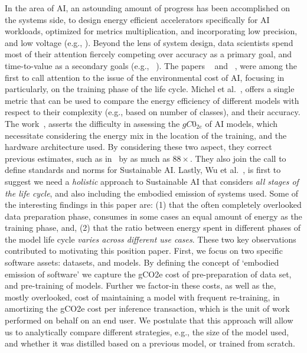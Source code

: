 {{        In the area of AI, an astounding amount of progress has been accomplished on the systems side, to design energy efficient accelerators specifically for AI workloads, optimized for metrics multiplication, and incorporating low precision, and low voltage (e.g., \cite{Agrawal2016,Brooks2000}). Beyond the lens of system design, data scientists spend most of their attention fiercely competing over accuracy as a primary goal, and time-to-value as a secondary goals (e.g., ~\cite{Liu2019}). The papers ~\cite{Strubell2019} and ~\cite{Schwartz2019}, were among the first to call attention to the issue of the environmental cost of AI, focusing in particularly, on the training phase of the life cycle. {Michel et al.}~\cite{Lenherr2021}, offers a single metric that can be used to compare the energy efficiency of different models with respect to their complexity (e.g., based on number of classes), and their accuracy. The work~\cite{Patterson2021}, asserts the difficulty in assessing the $gC0_{2e}$ of AI models, which necessitate considering the energy mix in the location of the training, and the hardware architecture used. By considering these two aspect, they correct previous estimates, such as in~\cite{Strubell2019} by as much as $88 \times$. They also join the call to define standards and norms for Sustainable AI. Lastly, {Wu et al.}~\cite{Wu2022}, is first to suggest we need a \textit{holistic} approach to Sustainable AI that considers \textit{all stages of the life cycle}, and also including the embodied emission of systems used. Some of the interesting findings in this paper are: (1) that the often completely overlooked data preparation phase, consumes in some cases an equal amount of energy as the training phase, and, (2) that the ratio between energy spent in different phases of the model life cycle  \textit{varies across different use cases}. These two key observations contributed to motivating this position paper. First, we focus on two specific software assets: datasets, and models. By defining the concept of `embodied emission of software' we capture the gCO2e cost of pre-preparation of data set, and pre-training of models. Further we factor-in these costs, as well as the, mostly overlooked, cost of maintaining a model with frequent re-training, in amortizing the gCO2e cost per inference transaction, which is the unit of work performed on behalf on an end user. We postulate that this  approach will allow us to analytically compare different strategies, e.g., the size of the model used, and whether it was distilled based on a previous model, or trained from scratch. 
    }

}

